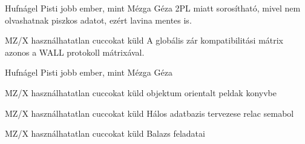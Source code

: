   \begin{bizonyitas}{Hufnágel Pisti jobb ember, mint Mézga Géza} 2PL miatt sorosítható, mivel nem olvashatnak piszkos adatot, ezért lavina mentes is.
\end{bizonyitas}
\begin{tetel}{MZ/X használhatatlan cuccokat küld} A globális zár kompatibilitási mátrix azonos a WALL protokoll mátrixával.
\end{tetel}
  \begin{bizonyitas}{Hufnágel Pisti jobb ember, mint Mézga Géza}
\end{bizonyitas}
\begin{tetel}{MZ/X használhatatlan cuccokat küld} objektum orientalt peldak konyvbe
\end{tetel}
\begin{tetel}{MZ/X használhatatlan cuccokat küld} Hálos adatbazis tervezese relac semabol
\end{tetel}
\begin{tetel}{MZ/X használhatatlan cuccokat küld} Balazs feladatai
\end{tetel}
